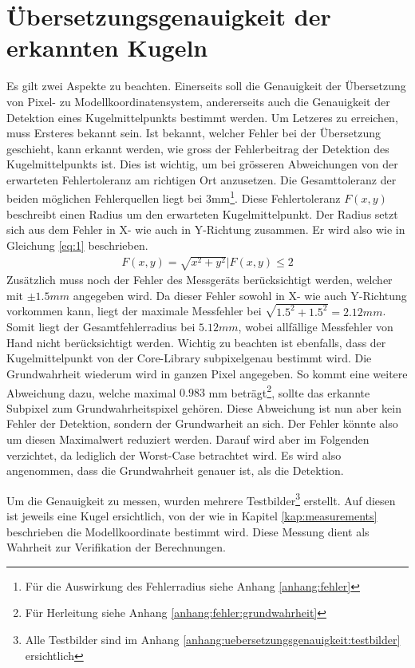 \section{Übersetzungsgenauigkeit der erkannten Kugeln}\label{kap:uebersetzungsgenauigkeit}
Es gilt zwei Aspekte zu beachten. Einerseits soll die Genauigkeit der Übersetzung von Pixel- zu Modellkoordinatensystem,
andererseits auch die Genauigkeit der Detektion eines Kugelmittelpunkts bestimmt werden.
Um Letzeres zu erreichen, muss Ersteres bekannt sein. Ist bekannt, welcher Fehler bei der Übersetzung geschieht, kann
erkannt werden, wie gross der Fehlerbeitrag der Detektion des Kugelmittelpunkts ist. Dies ist wichtig, um bei
grösseren Abweichungen von der erwarteten Fehlertoleranz am richtigen Ort anzusetzen. Die Gesamttoleranz der beiden
möglichen Fehlerquellen liegt bei 3mm\footnote{Für die Auswirkung des Fehlerradius siehe Anhang \ref{anhang:fehler}}. Diese Fehlertoleranz $F(x,y)$ beschreibt einen Radius um den erwarteten Kugelmittelpunkt.
Der Radius setzt sich aus dem Fehler in X- wie auch in Y-Richtung zusammen. Er wird also wie in Gleichung \ref{eq:1} beschrieben.
\begin{align}
    F(x,y) = \sqrt{x^2 + y^2} | F(x,y) \leq 2\label{eq:1}
\end{align}
Zusätzlich muss noch der Fehler des Messgeräts berücksichtigt werden, welcher mit $\pm 1.5mm$ angegeben wird. Da dieser
Fehler sowohl in X- wie auch Y-Richtung vorkommen kann, liegt der maximale Messfehler bei $\sqrt{1.5^2 + 1.5^2} = 2.12mm$. Somit liegt
der Gesamtfehlerradius bei $5.12mm$, wobei allfällige Messfehler von Hand nicht berücksichtigt werden. Wichtig zu beachten ist
ebenfalls, dass der Kugelmittelpunkt von der Core-Library subpixelgenau bestimmt wird. Die Grundwahrheit wiederum wird in
ganzen Pixel angegeben. So kommt eine weitere Abweichung dazu, welche maximal $0.983$ mm beträgt\footnote{Für Herleitung siehe Anhang \ref{anhang:fehler:grundwahrheit}},
sollte das erkannte Subpixel zum Grundwahrheitspixel gehören.
Diese Abweichung ist nun aber kein Fehler der Detektion, sondern der Grundwarheit an sich. Der Fehler könnte also um diesen
Maximalwert reduziert werden. Darauf wird aber im Folgenden verzichtet, da lediglich der Worst-Case betrachtet wird. Es wird
also angenommen, dass die Grundwahrheit genauer ist, als die Detektion.

Um die Genauigkeit zu messen, wurden mehrere Testbilder\footnote{Alle Testbilder sind im Anhang \ref{anhang:uebersetzungsgenauigkeit:testbilder} ersichtlich}
erstellt. Auf diesen ist jeweils eine Kugel ersichtlich, von der
wie in Kapitel \ref{kap:measurements} beschrieben die Modellkoordinate bestimmt wird. Diese Messung dient als Wahrheit zur
Verifikation der Berechnungen.

